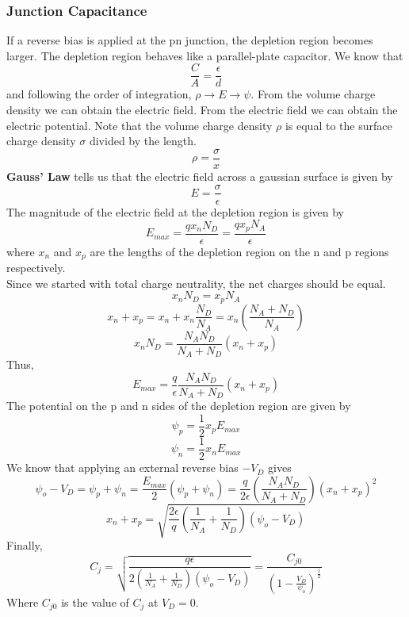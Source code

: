 \documentclass{article}
\begin{document}
\newpage
\subsubsection{Junction Capacitance}
\noindent 
If a reverse bias is applied at the pn junction, the depletion region becomes larger. 
The depletion region behaves like a parallel-plate capacitor. We know that 
$$\frac{C}{A} = \frac{\epsilon}{d}$$
and following the order of integration, $\rho \rightarrow E \rightarrow \psi.$ 
From the volume charge density we can obtain the electric field. From the electric field 
we can obtain the electric potential. Note that the volume charge density $\rho$ is 
equal to the surface charge density $\sigma$ divided by the length. 
$$\rho = \frac{\sigma}{x}$$
\vspace{8pt}
\textbf{Gauss' Law} tells us that the electric field across a gaussian surface is given 
by $$E=\frac{\sigma}{\epsilon}$$
The magnitude of the electric field at the depletion region is given by
$$\boxed{E_{max} = \frac{qx_nN_D}{\epsilon} = \frac{qx_pN_A}{\epsilon}}$$ where $x_n$ and $x_p$
are the lengths of the depletion region on the n and p regions respectively. 
\vspace{8pt}
\\ Since we started with total charge neutrality, the net charges should be equal. 
$$x_nN_D = x_pN_A$$
$$x_n + x_p = x_n + x_n \frac{N_D}{N_A} = x_n \left(\frac{N_A + N_D}{N_A}\right)$$
$$\boxed{x_n N_D = \frac{N_A N_D}{N_A + N_D}(x_n + x_p)}$$
Thus, $$E_{max}= \frac{q}{\epsilon} \frac{N_A N_D}{N_A + N_D}(x_n + x_p)$$
The potential on the p and n sides of the depletion region are given by 
$$\psi_p = \frac{1}{2}x_p E_{max}$$ $$\psi_n = \frac{1}{2}x_n E_{max}$$
We know that applying an external reverse bias $-V_D$ gives 
$$\psi_o - V_D = \psi_p + \psi_n = \frac{E_{max}}{2}(\psi_p + \psi_n)
= \frac{q}{2\epsilon}\left(\frac{N_A N_D}{N_A + N_D}\right)(x_n + x_p)^2$$
$$x_n + x_p = \sqrt{\frac{2\epsilon}{q}\left(\frac{1}{N_A}+\frac{1}{N_D}\right) 
(\psi_o - V_D)}$$
Finally, 
$$\boxed{C_j = \sqrt{\frac{q\epsilon}{2\left(\frac{1}{N_A}+\frac{1}{N_D}\right)
(\psi_o -V_D)}} = \frac{C_{j0}}{\left(1-\frac{V_D}{\psi_o}\right)^\frac{1}{2}}}$$
Where $C_{j0}$ is the value of $C_j$ at $V_D = 0$.
\end{document}
